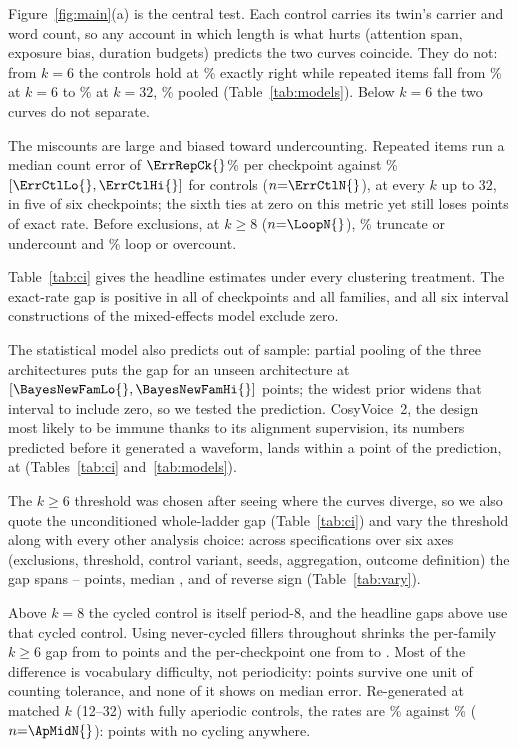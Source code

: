 \documentclass{article}
\begin{document}
Figure~\ref{fig:main}(a) is the central test. Each control
carries its twin's carrier and word count, so any account in which
length is what hurts (attention span, exposure bias, duration budgets)
predicts the two curves coincide.
They do not: from $k{=}6$ the controls hold at \ExactCtl{}\% exactly
right while repeated items fall from \ExactRepKLo{}\% at $k{=}6$ to
\ExactRepKHi{}\% at $k{=}32$, \ExactRep{}\% pooled
(Table~\ref{tab:models}). Below $k{=}6$ the two curves do not separate.

The miscounts are large and biased toward undercounting. Repeated items
run a median count error of $\ErrRepCk{}$\% per checkpoint against
\ErrCtl{}\% $[\ErrCtlLo{},\ErrCtlHi{}]$ for controls
($n{=}\ErrCtlN{}$), at every $k$ up to $32$, in five of six checkpoints;
the sixth ties at zero on this metric yet still loses \CkRevExact{}
points of exact rate. Before exclusions, at $k{\ge}8$ ($n{=}\LoopN{}$),
\TruncPct{}\% truncate or undercount and \LoopPct{}\% loop or overcount.

Table~\ref{tab:ci} gives the headline estimates under every clustering
treatment. The exact-rate gap is positive in all \CkExactNPos{} of \CkExactN{}
checkpoints and all \FamExactN{} families, and all six interval
constructions of the mixed-effects model exclude zero.

The statistical model also predicts out of sample: partial pooling of
the three architectures puts the gap for an unseen architecture at
\BayesNewFam{} $[\BayesNewFamLo{},\BayesNewFamHi{}]$ points; the widest
prior widens that interval to include zero, so we tested the prediction. CosyVoice~2, the design most likely to be immune thanks to
its alignment supervision, its numbers predicted before it generated a
waveform, lands within a point of the prediction, at \CosyGap{}
(Tables~\ref{tab:ci} and~\ref{tab:models}).

The $k{\ge}6$ threshold was chosen after seeing where the curves diverge, so
we also quote the unconditioned whole-ladder gap (Table~\ref{tab:ci}) and
vary the threshold along with every other analysis choice: across \SpecN{}
specifications over six axes (exclusions, threshold, control variant,
seeds, aggregation, outcome definition) the gap spans
\SpecLo{}--\SpecHi{} points, median \SpecMed{}, and \SpecNRev{} of \SpecN{}
reverse sign (Table~\ref{tab:vary}).

Above $k{=}8$ the cycled control is itself period-8, and the headline
gaps above use that cycled control. Using never-cycled fillers throughout
shrinks the per-family $k{\ge}6$ gap from \ApHeadFamCyc{} to
\ApHeadFam{} points and the per-checkpoint one from \ApHeadCkCyc{} to
\ApHeadCk{}. Most of the difference is
vocabulary difficulty, not periodicity: \ApHeadTolDrop{} points survive one
unit of counting tolerance, and none of it shows on median error.
Re-generated at matched $k$ (12--32) with fully
aperiodic controls, the rates are \ApMidRep{}\% against \ApMidCtl{}\%
($n{=}\ApMidN{}$): \ApMidGap{} points with no cycling anywhere.
\end{document}
